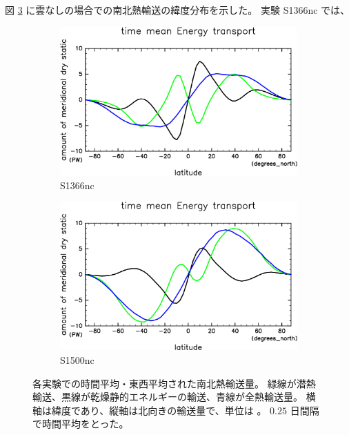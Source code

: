 \documentclass[body]{subfiles}
\begin{document}

\clearpage
図 \ref{EnFlxnc} に雲なしの場合での南北熱輸送の緯度分布を示した。
実験 S1366nc では、

\begin{figure}[t]
	\centering
	\begin{subfigure}{.4\textwidth}
		\centering
		\includegraphics[width=\columnwidth]{S1366-nc/EngyFlx,time=3650:4015-crop-rotate.pdf}
		\caption{S1366nc}\label{EnFlxS1366nc}
	\end{subfigure}
	\begin{subfigure}{.4\textwidth}
		\centering
		\includegraphics[width=\columnwidth]{S1500-nc/EngyFlx,time=3650:4015-crop-rotate.pdf}
		\caption{S1500nc}\label{EnFlxS1500nc}
	\end{subfigure}
	\caption[各実験での南北熱輸送量]{
		各実験での時間平均・東西平均された南北熱輸送量。
		緑線が潜熱輸送、黒線が乾燥静的エネルギーの輸送、青線が全熱輸送量。
		横軸は緯度であり、縦軸は北向きの輸送量で、単位は 。
		\(0.25\) 日間隔で時間平均をとった。
	}\label{EnFlxnc}
\end{figure}
\end{document}
